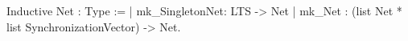 Inductive Net : Type :=
  | mk_SingletonNet: LTS -> Net
  | mk_Net         : (list Net * list SynchronizationVector) -> Net.